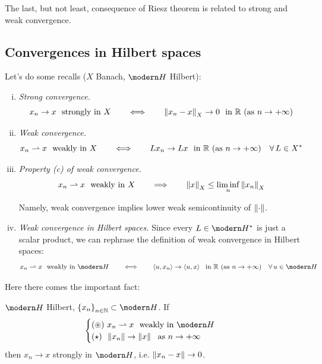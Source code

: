 \bigskip
\bigskip

The last, but not least, consequence of Riesz theorem is related to strong and weak convergence.

\newpage

\subsection{Convergences in Hilbert spaces}

Let's do some recalls ($X$ Banach, $\Hc$ Hilbert):
\begin{enumerate}[(i)]
\item \emph{Strong convergence.}
\begin{equation*}
x_n\to x\ \text{ strongly in }X\qquad\Longleftrightarrow\qquad\left\lVert x_n-x \right\rVert_X\to 0\ \text{ in }\mathbb{R}\ (\text{as }n\to+\infty)
\end{equation*}

\item \emph{Weak convergence.} 
\begin{equation*}
x_n\rightharpoonup x\ \text{ weakly in }X\qquad\Longleftrightarrow\qquad Lx_n\to Lx\ \text{ in }\RR\ (\text{as }n\to+\infty)\quad\forall L\in X^*
\end{equation*}

\item \emph{Property (c) of weak convergence.}
\begin{equation*}
x_n\rightharpoonup x\ \text{ weakly in }X\qquad\Longrightarrow\qquad \left\lVert x \right\rVert_X\leq \liminf_n\left\lVert x_n \right\rVert_X
\end{equation*}

Namely, weak convergence implies lower weak semicontinuity of $\left\lVert \cdot \right\rVert$.

\item \emph{Weak convergence in Hilbert spaces.} Since every $L\in\Hc^*$ is just a scalar product, we can rephrase the definition of weak convergence in Hilbert spaces:
\begin{equation*}
x_n\rightharpoonup x\ \text{ weakly in }\Hc\qquad\Longleftrightarrow\qquad \sca{u,x_n}\to \sca{u,x}\ \text{ in }\RR\ (\text{as }n\to+\infty)\quad\forall u\in \Hc
\end{equation*}

\end{enumerate}

Here there comes the important fact:
\begin{proposition}
$\Hc$ Hilbert, $\left\{ x_n \right\}_{n\in\NN}\subset \Hc$. If
\begin{equation*}
\begin{cases}
    (\circledast)\ x_n\rightharpoonup x\ \text{ weakly in }\Hc\\
    (\star)\ \,\norm{x_n}\to\norm{x}\ \text{ as }n\to+\infty
\end{cases}
\end{equation*}
then $x_n\to x$ strongly in $\Hc$, i.e. $\left\lVert x_n-x \right\rVert\to 0$.
\end{proposition}


